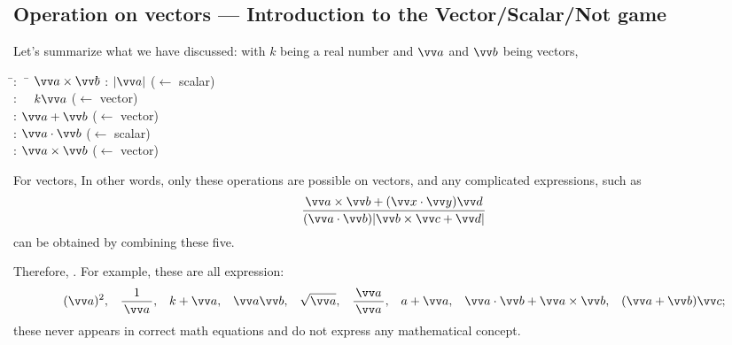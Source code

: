 \documentclass[11pt,pdfa,lastpage]{MishoNote}
\begin{document}
\subsection[Operation on Vectors]{Operation on vectors — Introduction to the Vector/Scalar/Not game}
Let's summarize what we have discussed: with $k$ being a real number and $\vc a$ and $\vc b$ being vectors,
\begin{tabbing}
\fakebullet \= :~~\= $\vc a\times\vc b$\quad \= \kill
\fakebullet \> :              \> $|\vc a|$           \> ($\leftarrow$ scalar)\\
\fakebullet \> :~~\> $k\vc a$            \> ($\leftarrow$ vector)\\
\fakebullet \> :               \> $\vc a+\vc b$       \> ($\leftarrow$ vector)\\
\fakebullet \> :          \> $\vc a\cdot\vc b$   \> ($\leftarrow$ scalar)\\
\fakebullet \> :          \> $\vc a\times\vc b$  \> ($\leftarrow$ vector)
\end{tabbing}
For vectors,  In other words, only these operations are possible on vectors, and any complicated expressions, such as
\[
\frac{\vc a\times \vc b+(\vc x\cdot\vc y)\vc d}{(\vc a\cdot\vc b)|\vc b\times\vc c+\vc d|}
\]
can be obtained by combining these five.

Therefore, . For example, these are all  expression:
{
\color{AltDefA}
\begin{align*}
   (\vc a)^2,
 && \frac{1}{\,\vc a\,},
 && k+\vc a,
 && \vc a\vc b,
 && \sqrt{\vc a},
 && \frac{\vc a}{\,\vc a\,},
 && a+\vc a,
 && \vc a\cdot\vc b+\vc a\times\vc b,
 && (\vc a+\vc b)\vc c;
\end{align*}
}
these never appears in correct math equations and do not express any mathematical concept.
\end{document}
